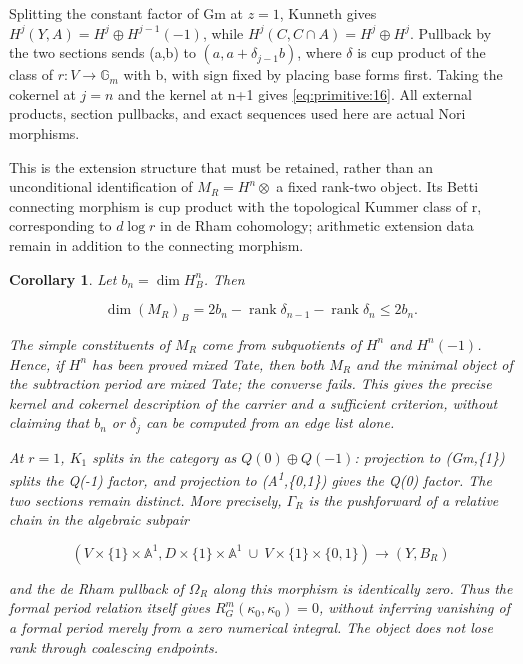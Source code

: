 \documentclass[11pt,a4paper,oneside]{article}
\theoremstyle{plain}
\newtheorem{corollary}[theorem]{Corollary}
\theoremstyle{definition}
\theoremstyle{remark}
\numberwithin{equation}{section}
\begin{document}
Splitting the constant factor of Gm at \(z=1\), Kunneth gives \(H^j(Y,A)=H^j\oplus H^{j-1}(-1)\), while \(H^j(C,C\cap A)=H^j\oplus H^j\). Pullback by the two sections sends (a,b) to \((a,a+\delta _{j-1}b)\), where \(\delta \) is cup product of the class of \(r:V\to \mathbb G_m\) with b, with sign fixed by placing base forms first. Taking the cokernel at \(j=n\) and the kernel at n+1 gives \eqref{eq:primitive:16}. All external products, section pullbacks, and exact sequences used here are actual Nori morphisms.

This is the extension structure that must be retained, rather than an unconditional identification of \(M_R=H^n\otimes \) a fixed rank-two object. Its Betti connecting morphism is cup product with the topological Kummer class of r, corresponding to \(d\log  r\) in de Rham cohomology; arithmetic extension data remain in addition to the connecting morphism.

\begin{corollary}

\label{thm:primitive:5.1} Let \(b_n=\operatorname{dim} H^n_B\). Then

\begin{equation}
\dim(M_R)_B=2b_n-\operatorname{rank}\delta_{n-1}
                         -\operatorname{rank}\delta_n\le2b_n.               \label{eq:primitive:17}
\end{equation}

The simple constituents of \(M_R\) come from subquotients of \(H^n\) and \(H^n(-1)\). Hence, if \(H^n\) has been proved mixed Tate, then both \(M_R\) and the minimal object of the subtraction period are mixed Tate; the converse fails. This gives the precise kernel and cokernel description of the carrier and a sufficient criterion, without claiming that \(b_n\) or \(\delta _j\) can be computed from an edge list alone.

At \(r=1\), \(K_1\) splits in the category as \(Q(0)\oplus Q(-1)\): projection to (Gm,\{1\}) splits the Q(-1) factor, and projection to (A\textsuperscript{1},\{0,1\}) gives the Q(0) factor. The two sections remain distinct. More precisely, \(\Gamma _R\) is the pushforward of a relative chain in the algebraic subpair

\begin{equation}
(V\times\{1\}\times\mathbb A^1,
 D\times\{1\}\times\mathbb A^1\ \cup\ V\times\{1\}\times\{0,1\})
                       \longrightarrow(Y,B_R)
\end{equation}

and the de Rham pullback of \(\Omega _R\) along this morphism is identically zero. Thus the formal period relation itself gives \(R_G^m(\kappa _0,\kappa _0)=0\), without inferring vanishing of a formal period merely from a zero numerical integral. The object does not lose rank through coalescing endpoints.

\end{corollary}
\end{document}
